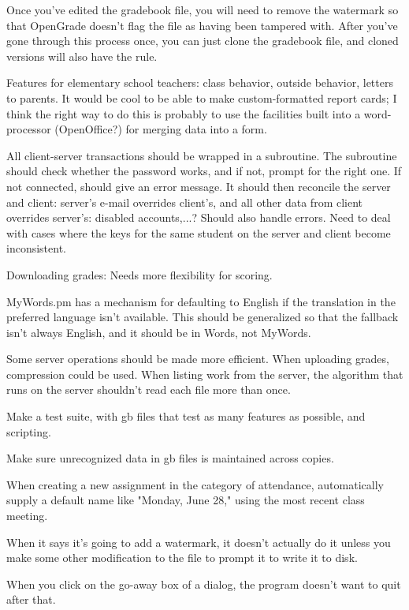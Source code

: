 \documentclass{opengrade_doc}
\begin{document}
Once you've edited the gradebook file, you will need to remove the watermark
so that OpenGrade doesn't flag the file as having been tampered with. After
you've gone through this process once, you can just clone the gradebook file,
and cloned versions will also have the rule.

\label{improve}
Features for elementary school teachers: class behavior, outside behavior,
letters to parents.
It would be cool to be able to make custom-formatted report cards; I think
the right way to do this is probably to use the facilities built into
a word-processor (OpenOffice?)
for merging data into a form.

All client-server transactions should be wrapped in a subroutine. The
subroutine should check whether the password works, and if not, prompt
for the right one. If not connected, should give an error message.
It should then reconcile the server and client:
server's e-mail overrides client's, and all other data from client
overrides server's: disabled accounts,...? Should also handle errors.
Need to deal with cases where the keys for the same student on the server
and client become inconsistent.

Downloading grades: Needs more flexibility
for scoring.

MyWords.pm has a mechanism for defaulting to English if the translation
in the preferred language isn't available. This should be generalized
so that the fallback isn't always English, and it should be in
Words, not MyWords.

Some server operations should be made more efficient. When uploading
grades, compression could be used. When listing work from the server,
the algorithm that runs on the server shouldn't read each file more
than once.

Make a test suite, with gb files that test as many features as possible,
and scripting.

Make sure unrecognized data in gb files is maintained across copies.

When creating a new assignment in the category of attendance, automatically supply a default
     name like "Monday, June 28," using the most recent class meeting.

When it says it's going to add a watermark, it doesn't actually do it unless you make some
other modification to the file to prompt it to write it to disk.

When you click on the go-away box of a dialog, the program doesn't want to quit after that.
\end{document}
